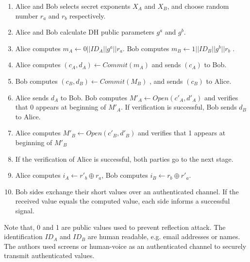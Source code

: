\begin{enumerate}
\item Alice and Bob selects secret exponents $X_A$ and $X_B$, and choose random number $r_a$ and $r_b$ respectively. 
\item Alice and Bob calculate DH public parameters $g^a$ and $g^b$. 
\item Alice computes $m_A \leftarrow 0||ID_A||g^a||r_a$. Bob computes $m_B \leftarrow 1||ID_B||g^b||r_b$ .
\item Alice computes $(c_A,d_A) \leftarrow Commit(m_A)$ and sends $(c_A)$ to Bob.
\item Bob computes $(c_B,d_B) \leftarrow Commit(M_B)$ , and sends $(c_B)$ to Alice.
\item Alice sends $d_A$ to Bob. Bob computes $M'_A \leftarrow Open(c'_A,d'_A)$ and verifies that 0 appears at beginning of $M'_A$. If verification is successful, Bob sends $d_B$ to Alice.
\item Alice computes $M'_B \leftarrow Open(c'_B,d'_B)$ and verifies that 1 appears at beginning of $M'_B$
 \item If the verification of Alice is successful, both parties go to the next stage.
\item Alice computes $i_A \leftarrow r'_b \oplus r_a$, Bob computes $i_B \leftarrow r_b \oplus r'_a$.
\item Bob sides exchange their short values over an authenticated channel. If the received value equals the computed value, each side informs a successful signal. 
\end{enumerate}

Note that, 0 and 1 are public values used to prevent reflection attack. The identification $ID_A$ and $ID_B$ are human readable, e.g. email addresses or names. The authors used screens or human-voice as an authenticated channel to securely transmit authenticated values.
 
